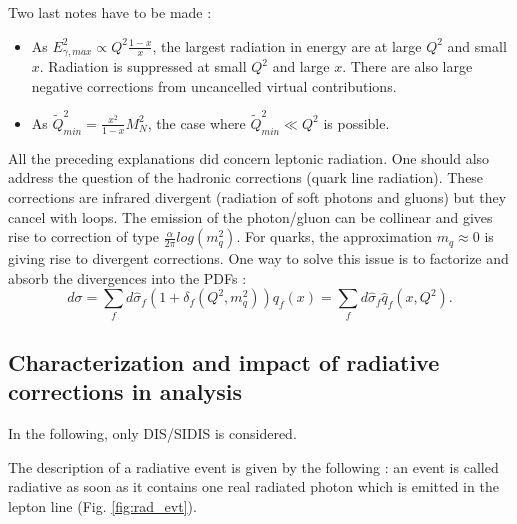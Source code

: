 Two last notes have to be made :
\begin{itemize}
\item As $E^{2}_{\gamma,max} \propto Q^{2}\frac{1-x}{x}$, the largest radiation in energy are at large $Q^{2}$ and small $x$. Radiation is suppressed at small $Q^{2}$ and large $x$. There are also large negative corrections from uncancelled virtual contributions.
\item As $\tilde{Q}^{2}_{min} = \frac{x^{2}}{1-x}M^{2}_{N}$, the case where $\tilde{Q}^{2}_{min} \ll Q^{2}$ is possible.
\end{itemize}

All the preceding explanations did concern leptonic radiation. One should also address the question of the hadronic corrections (quark line radiation). These corrections are infrared divergent (radiation of soft photons and gluons) but they cancel with loops. The emission of the photon/gluon can be collinear and gives rise to correction of type $\frac{\alpha}{2\pi}log(m_{q}^{2})$. For quarks, the approximation $m_{q} \approx 0$ is giving rise to divergent corrections. One way to solve this issue is to factorize and absorb the divergences into the PDFs :
%
\begin{equation}
  d\sigma = \sum_{f}d\hat{\sigma}_{f}(1+\delta_{f}(Q^{2},m^{2}_{q}))q_{f}(x) = \sum_{f}d\hat{\sigma}_{f}\hat{q}_{f}(x,Q^{2}).
\end{equation}

\subsection{Characterization and impact of radiative corrections in analysis}

In the following, only DIS/SIDIS is considered.

The description of a radiative event is given by the following : an event is called radiative as soon as it contains one real radiated photon which is emitted in the lepton line (Fig. \ref{fig:rad_evt}).

